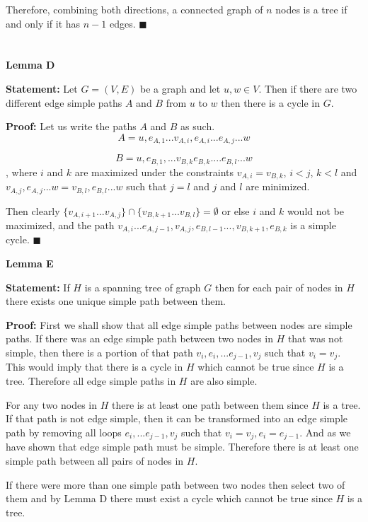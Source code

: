 \documentclass{article}
\newcommand*{\QEDA}{\hfill\ensuremath{\blacksquare}}%
\begin{document}
Therefore, combining both directions, a connected graph of $n$  nodes is a tree if and only if it has $n-1$ edges.
\QEDA

\section{}
\textbf{Lemma D}

\textbf{Statement:}  Let $G = (V,E)$ be a graph and let $u,w \in V$. Then if there are two different edge simple paths $A$ and $B$ from $u$ to $w$ then there is a cycle in $G$. 

\textbf{Proof:} 
Let us write the paths $A$ and $B$ as such.
\[
A = u, e_{A,1}... v_{A,i},e_{A,i}...e_{A,j}...w
\]

\[
B =  u, e_{B,1}, ...v_{B,k} e_{B,k}....e_{B,l}...w
\]
, where $i$ and $k$ are maximized under the constraints $v_{A,i} = v_{B,k}$, $i < j$, $k < l$ and $v_{A,j},e_{A,j}...w = v_{B,l},e_{B,l}...w$ such that $j=l$ and $j$ and $l$ are minimized. 

Then clearly $\{v_{A,i+1}...v_{A,j}\} \cap \{ v_{B,k+1}...v_{B,l}\} = \emptyset$ or else $i$ and $k$ would not be maximized, and 
the path $v_{A,i}...e_{A,j-1},v_{A,j}, e_{B,l-1}...,v_{B,k+1},e_{B,k}$ is a simple cycle.
\QEDA


 
\textbf{Lemma E}

\textbf{Statement:} If $H$ is a spanning tree of graph $G$ then for each pair of nodes in $H$ there exists one unique simple path between them.

\textbf{Proof:} 
First we shall show that all edge simple paths between nodes are simple paths. If there was an edge simple path between two nodes in $H$ that was not simple, then there is a portion of that path $v_i, e_i, ... e_{j-1}, v_j$ such that $v_i = v_j$. This would imply that there is a cycle in $H$ which cannot be true since $H$ is a tree. Therefore all edge simple paths in $H$ are also simple. 

For any two nodes in $H$ there is at least one path between them since $H$ is a tree. If that path is not edge simple, then it can be transformed into an edge simple path by removing all loops $e_i, ... e_{j-1}, v_j$ such that $v_i = v_j, e_i = e_{j-1}$. And as we have shown that edge simple path must be simple. Therefore there is at least one simple path between all pairs of nodes in $H$. 

If there were more than one simple path between two nodes then select two of them and by Lemma D there must exist a cycle which cannot be true since $H$ is a tree.
\end{document}
